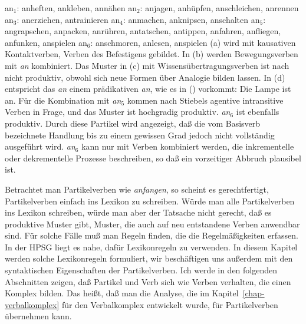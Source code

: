 \eal
\label{verschiedene-ans}
\ex an$_1$: anheften, ankleben, annähen                           
\ex an$_2$: anjagen,  anhüpfen, anschleichen, anrennen            
\ex an$_3$: anerziehen, antrainieren                              
\ex an$_4$: anmachen, anknipsen, anschalten                       
\ex an$_5$: angrapschen, anpacken, anrühren, antatschen, antippen,
            anfahren, anfliegen, anfunken, anspielen              
\ex an$_6$: anschmoren, anlesen, anspielen                        
\zl
(a) wird mit kausativen Kontaktverben, Verben des Befestigens gebildet. In
(b)
werden Bewegungsverben mit \emph{an} kombiniert. Das Muster in (c) mit Wissensübertragungsverben
ist nach \citet[]{Stiebels96a} nicht produktiv, obwohl sich neue Formen über Analogie bilden lassen.
In (d) entspricht das \emph{an} einem prädikativen \emph{an}, wie es in () vorkommt:
\ea
Die Lampe ist an.
\z
Für die Kombination mit \emph{an$_5$} kommen nach Stiebels agentive intransitive Verben in Frage,
und das Muster ist hochgradig produktiv.
\emph{an$_6$} ist ebenfalls produktiv. Durch diese Partikel wird angezeigt, daß die vom Basisverb
bezeichnete Handlung bis zu einem gewissen Grad jedoch nicht vollständig ausgeführt
wird. \emph{an$_6$} kann nur mit Verben kombiniert werden, die inkrementelle oder dekrementelle
Prozesse beschreiben, so daß ein vorzeitiger Abbruch plausibel ist.


Betrachtet man Partikelverben wie \emph{anfangen}, so scheint es gerechtfertigt, Partikelverben einfach
ins Lexikon zu schreiben. Würde man alle Partikelverben ins Lexikon schreiben, würde man aber der Tatsache
nicht gerecht, daß es produktive Muster gibt, \dash Muster, die auch auf neu entstandene Verben anwendbar
sind. Für solche Fälle muß man Regeln finden, die die Regelmäßigkeiten erfassen. In der HPSG liegt
es nahe, dafür Lexikonregeln zu verwenden. In diesem Kapitel werden solche Lexikonregeln formuliert,
wir beschäftigen uns außerdem mit den syntaktischen Eigenschaften der Partikelverben.
Ich werde in den folgenden Abschnitten zeigen, daß Partikel und Verb sich wie Verben verhalten,
die einen Komplex bilden. Das heißt, daß man die Analyse, die im Kapitel~\ref{chap-verbalkomplex}
für den Verbalkomplex entwickelt wurde, für Partikelverben übernehmen kann.

